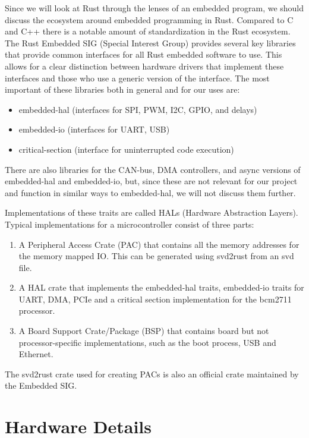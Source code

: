 Since we will look at Rust through the lenses of an embedded program, we should discuss the ecosystem around embedded programming in Rust.
Compared to C and C++ there is a notable amount of standardization in the Rust ecosystem.
The Rust Embedded SIG (Special Interest Group) provides several key libraries that provide common interfaces for all Rust embedded software to use.
This allows for a clear distinction between hardware drivers that implement these interfaces and those who use a generic version of the interface.
The most important of these libraries both in general and for our uses are:
\begin{itemize}
    \item embedded-hal (interfaces for SPI, PWM, I2C, GPIO, and delays)
    \item embedded-io (interfaces for UART, USB)
    \item critical-section (interface for uninterrupted code execution)
\end{itemize}

There are also libraries for the CAN-bus, DMA controllers, and async versions of embedded-hal and embedded-io,
but, since these are not relevant for our project and function in similar ways to embedded-hal,
we will not discuss them further.

Implementations of these traits are called HALs (Hardware Abstraction Layers).
Typical implementations for a microcontroller consist of three parts:
\begin{enumerate}
    \item A Peripheral Access Crate (PAC) that contains all the memory addresses for the memory mapped IO. This can be generated using svd2rust from an svd file.
    \item A HAL crate that implements the embedded-hal traits, embedded-io traits for UART, DMA, PCIe and a critical section implementation for the bcm2711 processor.
    \item A Board Support Crate/Package (BSP) that contains board but not processor-specific implementations, such as the boot process, USB and Ethernet.
\end{enumerate}

The svd2rust crate used for creating PACs is also an official crate maintained by the Embedded SIG.

\section{Hardware Details}
\label{sec:background:hardware}


